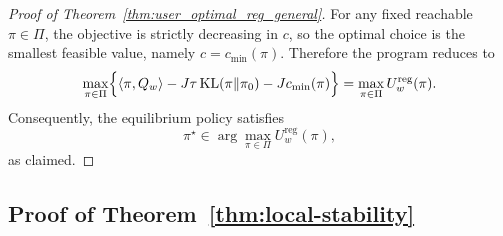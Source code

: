 \documentclass{article}
\newtheorem{lemma}{Lemma}
\begin{document}
\begin{proof}[Proof of Theorem~\ref{thm:user_optimal_reg_general}]
For any fixed reachable \(\pi\in\Pi\), the objective is strictly decreasing in \(c\), so the optimal choice is the smallest feasible value, namely \(c=c_{\min}(\pi)\). Therefore the program reduces to
\[
\max_{\pi\in\Pi}
\Bigl\{
\langle \pi,Q_w\rangle
- J\tau\,\mathrm{KL}(\pi\|\pi_0)
- Jc_{\min}(\pi)
\Bigr\}
=
\max_{\pi\in\Pi} U_w^{\mathrm{reg}}(\pi).
\]
Consequently, the equilibrium policy satisfies
\[
\pi^\star\in\arg\max_{\pi\in\Pi} U_w^{\mathrm{reg}}(\pi),
\]
as claimed.
\end{proof}

\subsection{Proof of Theorem~\ref{thm:local-stability}}

\end{document}
